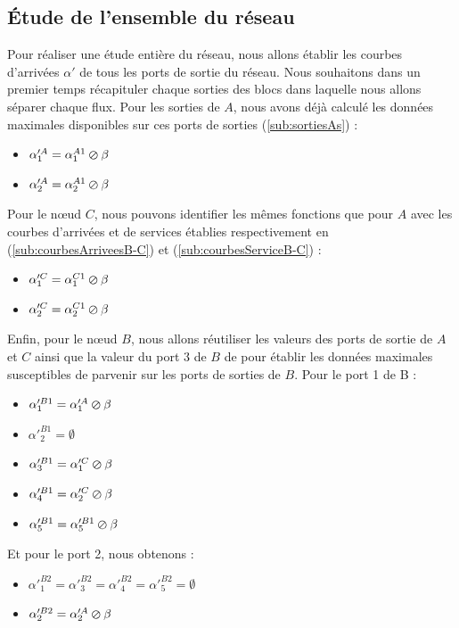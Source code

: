 \subsection{Étude de l'ensemble du réseau}
Pour réaliser une étude entière du réseau, nous allons établir les courbes d'arrivées $\alpha'$ de tous les ports de sortie du réseau. Nous souhaitons dans un premier temps récapituler chaque sorties des blocs dans laquelle nous allons séparer chaque flux. Pour les sorties de $A$, nous avons déjà calculé les données maximales disponibles sur ces ports de sorties (\ref{sub:sortiesAs}) :
\begin{itemize}
\item $\alpha'^{A}_1 = \alpha^{A1}_1 \varoslash \beta$
\item $\alpha'^{A}_2 = \alpha^{A1}_2 \varoslash \beta$
\end{itemize}
Pour le nœud $C$, nous pouvons identifier les mêmes fonctions que pour $A$ avec les courbes d'arrivées et de services établies respectivement en (\ref{sub:courbesArriveesB-C}) et (\ref{sub:courbesServiceB-C}) : 
\begin{itemize}
\item $\alpha'^{C}_1 = \alpha^{C1}_1 \varoslash \beta$
\item $\alpha'^{C}_2 = \alpha^{C1}_2 \varoslash \beta$
\end{itemize}
Enfin, pour le nœud $B$, nous allons réutiliser les valeurs des ports de sortie de $A$ et $C$ ainsi que la valeur du port 3 de $B$ de  pour établir les données maximales susceptibles de parvenir sur les ports de sorties de $B$. Pour le port 1 de B : \begin{itemize}
\item $\alpha'^{B1}_1 = \alpha'^{A}_1 \varoslash \beta$
\item $\alpha'^{B1}_2 = \emptyset$
\item $\alpha'^{B1}_3 = \alpha'^{C}_1 \varoslash \beta$
\item $\alpha'^{B1}_4 = \alpha'^{C}_2 \varoslash \beta$
\item $\alpha'^{B1}_5 = \alpha'^{B1}_5 \varoslash \beta$
 \end{itemize}
 Et pour le port 2, nous obtenons : \begin{itemize}
\item $\alpha'^{B2}_1 = \alpha'^{B2}_3 = \alpha'^{B2}_4 = \alpha'^{B2}_5 = \emptyset$
\item $\alpha'^{B2}_2 = \alpha'^{A}_2 \varoslash \beta$
 \end{itemize}

